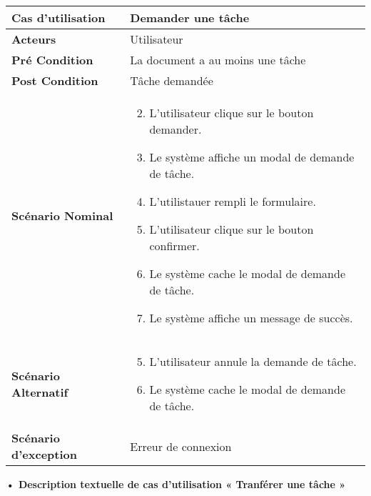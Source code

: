 \begin{longtable}{|p{5cm}|p{10cm}|}
\hline
\textbf{Cas d'utilisation}&Demander une tâche\\
\hline
\textbf{Acteurs}&Utilisateur\\
\hline
\textbf{Pré Condition}&La document a au moins une tâche\\
\hline
\textbf{Post Condition}&Tâche demandée\\
\hline
\textbf{Scénario Nominal}&
\vspace{-\baselineskip}
\begin{enumerate}
    \setcounter{enumi}{1}
    \item L'utilisateur clique sur le bouton demander.
    \item Le système affiche un modal de demande de tâche.
    \item L'utilistauer rempli le formulaire.
    \item L'utilisateur clique sur le bouton confirmer.
    \item Le système cache le modal de demande de tâche.
    \item Le système affiche un message de succès.
\end{enumerate}\\
\hline
\textbf{Scénario Alternatif}&
\vspace{-\baselineskip}
\begin{enumerate}
    \setcounter{enumi}{4}
    \item L'utilisateur annule la demande de tâche.
    \item Le système cache le modal de demande de tâche.
\end{enumerate}\\
\hline
\textbf{Scénario d'exception}&Erreur de connexion\\
\hline
\end{longtable}


\textbf{•	Description textuelle de cas d'utilisation « Tranférer une tâche »}

